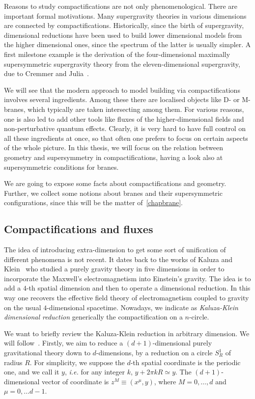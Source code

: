 \documentclass[draft]{phd}
\begin{document}
		Reasons to study compactifications are not only phenomenological.
		There are important formal motivations.
		Many supergravity theories in various dimensions are connected by compactifications.
		Historically, since the birth of supergravity, dimensional reductions have been used to build lower dimensional models from the higher dimensional ones, since the spectrum of the latter is usually simpler.
		A first milestone example is the derivation of the four-dimensional maximally supersymmetric supergravity theory from the eleven-dimensional supergravity, due to Cremmer and Julia~\cite{CremmerJulia}.
		
		We will see that the modern approach to model building via compactifications involves several ingredients. 
		Among these there are localised objects like D- or M-branes, which typically are taken intersecting among them.
		For various reasons, one is also led to add other tools like fluxes of the higher-dimensional fields and non-perturbative quantum effects. 
		Clearly, it is very hard to have full control on all these ingredients at once, so that often one prefers to focus on certain aspects of the whole picture. 
		In this thesis, we will focus on the relation between geometry and supersymmetry in compactifications, having a look also at supersymmetric conditions for branes.
		
		We are going to expose some facts about compactifications and geometry.
		Further, we collect some notions about branes and their supersymmetric configurations, since this will be the matter of~\ref{chapbrane}. 
	\subsection*{Compactifications and fluxes}
			The idea of introducing extra-dimension to get some sort of unification of different phenomena is not recent.
			It dates back to the works of Kaluza and Klein~\cite{Kaluza, Klein} who studied a purely gravity theory in five dimensions in order to incorporate the Maxwell's electromagnetism into Einstein's gravity.
			The idea is to add a $4$-th spatial dimension and then to operate a dimensional reduction. In this way one recovers the effective field theory of electromagnetism coupled to gravity on the usual $4$-dimensional spacetime.
			Nowadays, we indicate as \emph{Kaluza-Klein dimensional reduction} generically the compactification on a $n$-circle.
			
			We want to briefly review the Kaluza-Klein reduction in arbitrary dimension.
			We will follow~\cite{stellereview, popeKK}.
			Firstly, we aim to reduce a $(d+1)$-dimensional purely gravitational theory down to $d$-dimensions, by a reduction on a circle $S^1_R$ of radius $R$.
			For simplicity, we suppose the $d$-th spatial coordinate is the periodic one, and we call it $y$, \emph{i.e.} for any integer $k$, $y + 2\pi k R \simeq y$.
			The $(d+1)$-dimensional vector of coordinate is $z^M \equiv (x^\mu , y)$, where $M = 0,\ldots, d$ and $\mu = 0, \ldots d-1$.
			
\end{document}
